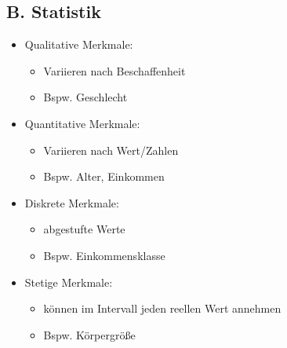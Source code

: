 \documentclass[a4paper]{article}
\begin{document}
\begin{landscape}
\begin{multicols}{4}
    \section{B. Statistik}
        \begin{itemize}[noitemsep,nolistsep,leftmargin=*]
            \item Qualitative Merkmale: 
                \begin{itemize}[noitemsep,nolistsep,leftmargin=*]
                    \item Variieren nach Beschaffenheit
                    \item Bspw. Geschlecht
                \end{itemize}
            \item Quantitative Merkmale:
                \begin{itemize}[noitemsep,nolistsep]
                    \item Variieren nach Wert/Zahlen
                    \item Bspw. Alter, Einkommen
                \end{itemize}
        \end{itemize}
        \begin{itemize}[noitemsep,nolistsep,leftmargin=*]
            \item Diskrete Merkmale: 
                \begin{itemize}[noitemsep,nolistsep,leftmargin=*]
                    \item abgestufte Werte
                    \item Bspw. Einkommensklasse
                \end{itemize}
            \item Stetige Merkmale:
                \begin{itemize}[noitemsep,nolistsep,leftmargin=*]
                    \item können im Intervall jeden reellen Wert annehmen
                    \item Bspw. Körpergröße
                \end{itemize}
        \end{itemize}

\end{multicols}
\end{landscape}
\end{document}
